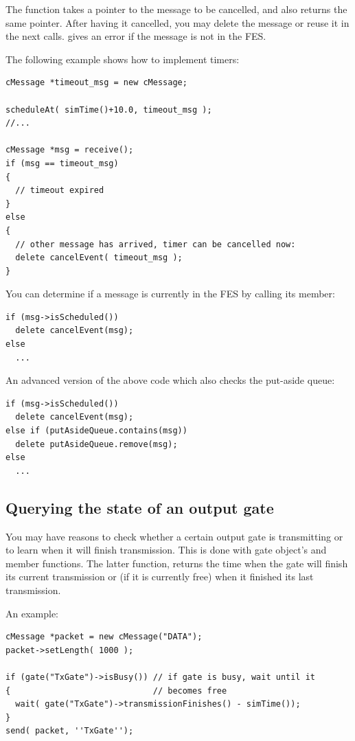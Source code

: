 The  function takes a pointer to the message to
be cancelled, and also returns the same pointer. After having it
cancelled, you may delete the message or reuse it in the next
 calls.  gives an error if
the message is not in the FES.

The following example shows how to implement timers:

\begin{Verbatim}
cMessage *timeout_msg = new cMessage;

scheduleAt( simTime()+10.0, timeout_msg );
//...

cMessage *msg = receive();
if (msg == timeout_msg)
{
  // timeout expired
}
else
{
  // other message has arrived, timer can be cancelled now:
  delete cancelEvent( timeout_msg );
}
\end{Verbatim}

You can determine if a message is currently in the FES by calling 
its  member:

\begin{Verbatim}
if (msg->isScheduled())
  delete cancelEvent(msg);
else
  ...
\end{Verbatim}

An advanced version of the above code which also checks the put-aside 
queue:

\begin{Verbatim}
if (msg->isScheduled())
  delete cancelEvent(msg);
else if (putAsideQueue.contains(msg))
  delete putAsideQueue.remove(msg);
else
  ...
\end{Verbatim}




\subsection{Querying the state of an output gate}

You may have reasons to check whether a certain output gate is
transmitting or to learn when it will finish
transmission. This is done with gate
object's  and  member
functions.  The latter function,  returns the
time when the gate will finish its current transmission or (if it is
currently free) when it finished its last transmission.


An example:

\begin{Verbatim}
cMessage *packet = new cMessage("DATA");
packet->setLength( 1000 );

if (gate("TxGate")->isBusy()) // if gate is busy, wait until it
{                             // becomes free
  wait( gate("TxGate")->transmissionFinishes() - simTime());
}
send( packet, ''TxGate'');
\end{Verbatim}


